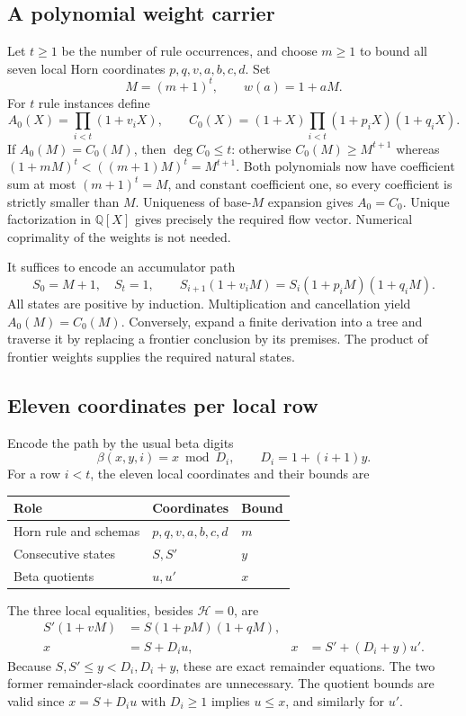 \documentclass[11pt,letterpaper]{article}
\theoremstyle{definition}\newtheorem{definition}[theorem]{Definition}
\theoremstyle{remark}\newtheorem{remark}[theorem]{Remark}
\newcommand{\Q}{\mathbb Q}
\begin{document}
\subsection{A polynomial weight carrier}

Let $t\ge1$ be the number of rule occurrences, and choose $m\ge1$ to
bound all seven local Horn coordinates $p,q,v,a,b,c,d$. Set
\[
 M=(m+1)^t,\qquad w(a)=1+aM.
\]
For $t$ rule instances define
\[
 A_0(X)=\prod_{i<t}(1+v_iX),\qquad
 C_0(X)=(1+X)\prod_{i<t}(1+p_iX)(1+q_iX).
\]
If $A_0(M)=C_0(M)$, then $\deg C_0\le t$: otherwise
$C_0(M)\ge M^{t+1}$ whereas
$(1+mM)^t<((m+1)M)^t=M^{t+1}$. Both polynomials now have coefficient
sum at most $(m+1)^t=M$, and constant coefficient one, so every
coefficient is strictly smaller than $M$. Uniqueness of base-$M$
expansion gives $A_0=C_0$. Unique factorization in $\Q[X]$ gives precisely
the required flow vector. Numerical coprimality of the weights is not needed.

It suffices to encode an accumulator path
\begin{equation}\label{eq:path}
 S_0=M+1,\quad S_t=1,\qquad
 S_{i+1}(1+v_iM)=S_i(1+p_iM)(1+q_iM).
\end{equation}
All states are positive by induction. Multiplication and cancellation
yield $A_0(M)=C_0(M)$. Conversely, expand a finite derivation into a tree
and traverse it by replacing a frontier conclusion by its premises.
The product of frontier weights supplies the required natural states.

\subsection{Eleven coordinates per local row}

Encode the path by the usual beta digits
\[
 \beta(x,y,i)=x\bmod D_i,\qquad D_i=1+(i+1)y.
\]
For a row $i<t$, the eleven local coordinates and their bounds are
\begin{center}
\begin{tabular}{lll}
\toprule
Role & Coordinates & Bound\\
\midrule
Horn rule and schemas & $p,q,v,a,b,c,d$ & $m$\\
Consecutive states & $S,S'$ & $y$\\
Beta quotients & $u,u'$ & $x$\\
\bottomrule
\end{tabular}
\end{center}
The three local equalities, besides $\mathcal H=0$, are
\begin{align}
 S'(1+vM)&=S(1+pM)(1+qM),\label{eq:local-acc}\\
 x&=S+D_i u, &x&=S'+(D_i+y)u'.\label{eq:local-beta}
\end{align}
Because $S,S'\le y<D_i,D_i+y$, these are exact remainder equations.
The two former remainder-slack coordinates are unnecessary. The quotient
bounds are valid since $x=S+D_i u$ with $D_i\ge1$ implies $u\le x$,
and similarly for $u'$.
\end{document}
